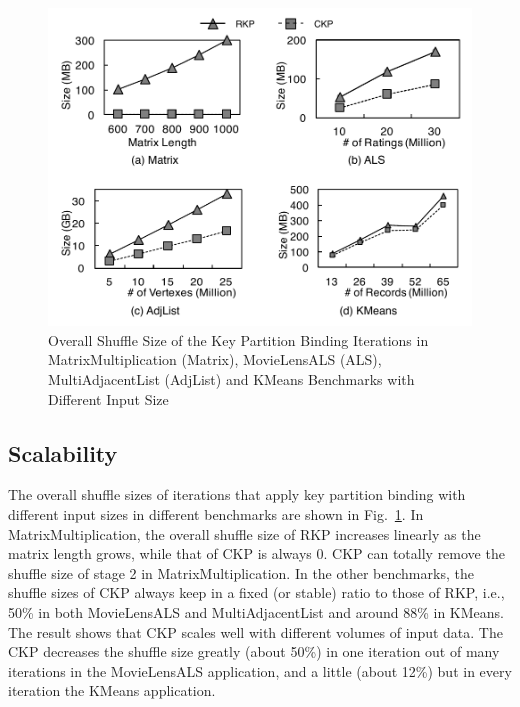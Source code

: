 \documentclass[10pt,journal,compsoc]{IEEEtran}
\begin{document}
\begin{figure}[!t]
\centering
\includegraphics[width=1\columnwidth]{figure7}
\caption{Overall Shuffle Size of the Key Partition 
Binding Iterations in MatrixMultiplication (Matrix), MovieLensALS (ALS), MultiAdjacentList (AdjList) and KMeans Benchmarks with Different Input Size}
\label{fig:sizeLine}
\end{figure}

\subsection{Scalability}
The overall shuffle sizes of iterations that apply key partition 
binding with different input sizes in different benchmarks are shown in Fig.~\ref{fig:sizeLine}. 
In MatrixMultiplication, 
the overall shuffle size of RKP increases linearly as the matrix length grows, while that of CKP is always 0. 
CKP can totally remove the shuffle size of stage 2 in MatrixMultiplication. 
In the other benchmarks, the shuffle sizes of CKP always keep in a fixed (or stable) ratio to those of RKP, i.e., 50\% in both MovieLensALS and MultiAdjacentList and around 88\% in KMeans. 
The result shows that CKP scales well with different volumes of input data. 
The CKP decreases the shuffle size greatly (about 50\%) in one iteration out of many iterations in the MovieLensALS application, and a little (about 12\%) but in every iteration the KMeans application. 
\end{document}
